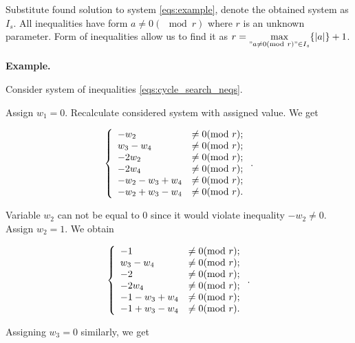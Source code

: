 \documentclass[a4paper,fleqn]{cas-sc}
\begin{document}
Substitute found solution to system \eqref{eqs:example}, denote the obtained system as $I_s$. All inequalities have form $a \neq 0 (\mod{r})$ where $r$ is an unknown parameter. Form of inequalities allow us to find it as $r = \max\limits_{"a \neq 0 (\mod{r})" \in I_s}\{ |a| \} + 1$.

\textbf{Example.}

Consider system of inequalities \eqref{eqs:cycle_search_neqs}.

Assign $w_1 = 0$. Recalculate considered system with assigned value. We get

\begin{equation}
    \centering
    \left\{
        \begin{array}{ll}
            - w_2 &\neq 0             (\mod{r}); \\
            w_3 - w_4 &\neq 0         (\mod{r}); \\
            - 2 w_2 &\neq 0           (\mod{r}); \\
            - 2 w_4 &\neq 0           (\mod{r}); \\
            - w_2 - w_3 + w_4 &\neq 0 (\mod{r}); \\
            - w_2 + w_3 - w_4 &\neq 0 (\mod{r}). \\
        \end{array}
    \right..
    \label{eqs:cycle_search_neqs_1}
\end{equation}

Variable $w_2$ can not be equal to $0$ since it would violate inequality $- w_2 \neq 0$. Assign $w_2 = 1$. We obtain

\begin{equation}
    \centering
    \left\{
        \begin{array}{ll}
            - 1 &\neq 0              (\mod{r}); \\
            w_3 - w_4 &\neq 0        (\mod{r}); \\
            - 2 &\neq 0              (\mod{r}); \\
            - 2 w_4 &\neq 0          (\mod{r}); \\
            - 1 - w_3 + w_4 &\neq 0  (\mod{r}); \\
            - 1 + w_3 - w_4 &\neq 0  (\mod{r}). \\
        \end{array}
    \right..
    \label{eqs:cycle_search_neqs_2}
\end{equation}

Assigning $w_3 = 0$ similarly, we get
\end{document}

